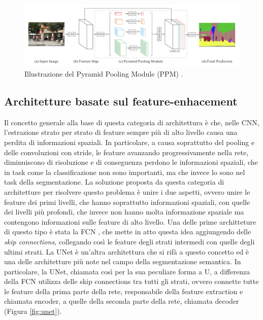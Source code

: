 \begin{figure}[h!]
    \centering
    \hspace*{-0.1in}
    \includegraphics[scale=0.3]{img/PPM.png}
    \caption{Illustrazione del Pyramid Pooling Module (PPM) \cite{pspnet}.}
    \label{fig:PPM}
\end{figure}




 
 \subsection{Architetture basate sul feature-enhacement}
Il concetto generale alla base di questa categoria di architettura è che, nelle CNN, l'estrazione strato per strato di feature sempre più di alto livello causa una perdita di informazioni spaziali. In particolare, a causa soprattutto del pooling e delle convoluzioni con stride, le feature avanzando progressivamente nella rete, diminuiscono di risoluzione e di conseguenza perdono le informazioni spaziali, che in task come la classificazione non sono importanti, ma che invece lo sono nel task della segmentazione. La soluzione proposta da questa categoria di architetture per risolvere questo problema è unire i due aspetti, ovvero unire le feature dei primi livelli, che hanno soprattutto informazioni spaziali, con quelle dei livelli più profondi, che invece non hanno molta informazione spaziale ma contengono informazioni sulle feature di alto livello. Una delle prime architteture di questo tipo è stata la FCN \cite{FCNs}, che mette in atto questa idea aggiungendo delle \textit{skip connections}, collegando così le feature degli strati intermedi con quelle degli ultimi strati. La UNet \cite{unet} è un'altra architettura che si rifà a questo concetto ed è una delle architetture più note nel campo della segmentazione semantica. In particolare, la UNet, chiamata così per la sua peculiare forma a U, a differenza della FCN utilizza delle skip connections tra tutti gli strati, ovvero connette tutte le feature della prima parte della rete, responsabile della feature extraction e chiamata encoder, a quelle della seconda parte della rete, chiamata decoder (Figura \ref{fig:unet}).
 
